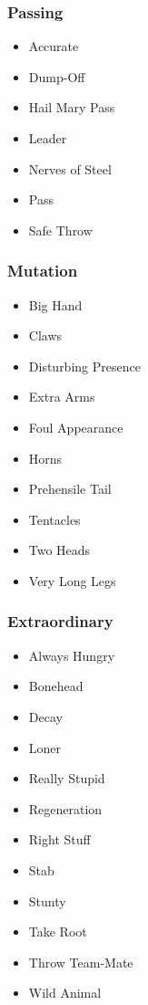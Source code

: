 \begin{multicols}{3}
\begin{samepage}
\subsubsection{Passing}
\begin{itemize}
\item[] Accurate
\item[] Dump-Off
\item[] Hail Mary Pass
\item[] Leader
\item[] Nerves of Steel
\item[] Pass
\item[] Safe Throw
\end{itemize}
\end{samepage}

\columnbreak

\begin{samepage}
\subsubsection{Mutation}
\begin{itemize}
\item[] Big Hand
\item[] Claws
\item[] Disturbing Presence
\item[] Extra Arms
\item[] Foul Appearance
\item[] Horns
\item[] Prehensile Tail
\item[] Tentacles
\item[] Two Heads
\item[] Very Long Legs
\end{itemize}
\end{samepage}

\begin{samepage}
\subsubsection{Extraordinary}
\begin{itemize}
\item[] Always Hungry
\item[] Bonehead
\item[] Decay
\item[] Loner
\item[] Really Stupid
\item[] Regeneration
\item[] Right Stuff
\item[] Stab
\item[] Stunty
\item[] Take Root
\item[] Throw Team-Mate
\item[] Wild Animal
\end{itemize}
\end{samepage}

\end{multicols}
